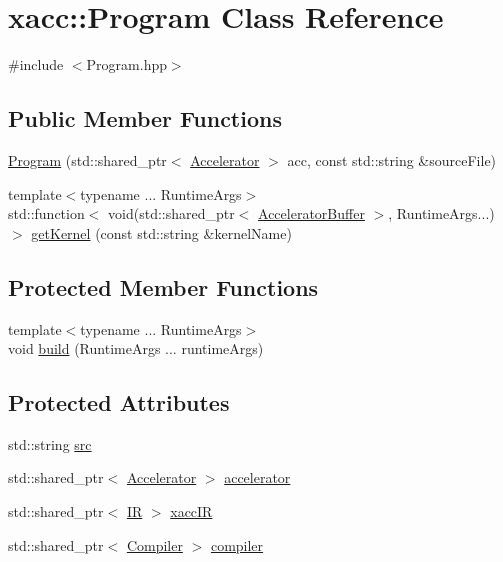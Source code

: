 \hypertarget{a02488}{}\section{xacc\+:\+:Program Class Reference}
\label{a02488}


{\ttfamily \#include $<$Program.\+hpp$>$}

\subsection*{Public Member Functions}
\begin{DoxyCompactItemize}
\item 
\hyperlink{a02488_a6d20079fde67a3ef145315e762249115}{Program} (std\+::shared\+\_\+ptr$<$ \hyperlink{a02432}{Accelerator} $>$ acc, const std\+::string \&source\+File)
\item 
{\footnotesize template$<$typename ... Runtime\+Args$>$ }\\std\+::function$<$ void(std\+::shared\+\_\+ptr$<$ \hyperlink{a02444}{Accelerator\+Buffer} $>$, Runtime\+Args...)$>$ \hyperlink{a02488_abf5023c9f01cac8a506bdef86760e8f1}{get\+Kernel} (const std\+::string \&kernel\+Name)
\end{DoxyCompactItemize}
\subsection*{Protected Member Functions}
\begin{DoxyCompactItemize}
\item 
{\footnotesize template$<$typename ... Runtime\+Args$>$ }\\void \hyperlink{a02488_a34161a470a998c6d103a1cf93da15af0}{build} (Runtime\+Args ... runtime\+Args)
\end{DoxyCompactItemize}
\subsection*{Protected Attributes}
\begin{DoxyCompactItemize}
\item 
std\+::string \hyperlink{a02488_aae78160f9f9e52a3e0c9b342996a7202}{src}
\item 
std\+::shared\+\_\+ptr$<$ \hyperlink{a02432}{Accelerator} $>$ \hyperlink{a02488_a10c948629c84f23dd426c04a9a518155}{accelerator}
\item 
std\+::shared\+\_\+ptr$<$ \hyperlink{a02480}{IR} $>$ \hyperlink{a02488_a5681f0989fc1c3fced8e30e815d6511c}{xacc\+IR}
\item 
std\+::shared\+\_\+ptr$<$ \hyperlink{a02448}{Compiler} $>$ \hyperlink{a02488_a0d2ae2522bb0daad0eea7871fc4e2061}{compiler}
\end{DoxyCompactItemize}


